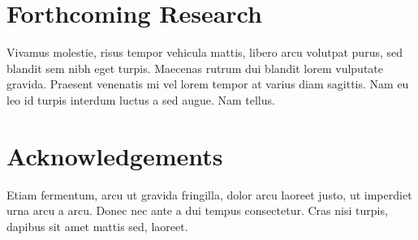 \documentclass[a0,portrait, 30pt]{a0poster}
\begin{document}
\begin{minipage}{0.49\linewidth}
\color{DarkSlateGray} %


\section*{Forthcoming Research}

Vivamus molestie, risus tempor vehicula mattis, libero arcu volutpat purus, sed blandit sem nibh eget turpis. Maecenas rutrum dui blandit lorem vulputate gravida. Praesent venenatis mi vel lorem tempor at varius diam sagittis. Nam eu leo id turpis interdum luctus a sed augue. Nam tellus.


\nocite{*} %


\section*{Acknowledgements}

Etiam fermentum, arcu ut gravida fringilla, dolor arcu laoreet justo, ut imperdiet urna arcu a arcu. Donec nec ante a dui tempus consectetur. Cras nisi turpis, dapibus sit amet mattis sed, laoreet.


\end{minipage}
\end{document}
